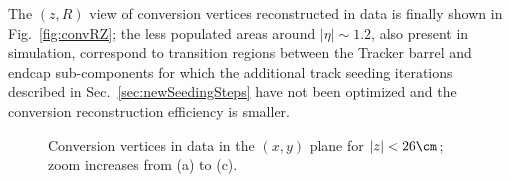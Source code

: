 The  $(z, R)$  view of conversion vertices reconstructed in data is finally shown in Fig.~\ref{fig:convRZ};  the less populated
areas  around $|\eta|\sim1.2$, also present in simulation, correspond to transition regions between the Tracker
barrel and endcap sub-components for which the additional track seeding
iterations described in Sec.~\ref{sec:newSeedingSteps} have not been optimized and the conversion reconstruction efficiency is smaller.

\begin{figure}[h!]
  \begin{center}
   \vspace{-0.6cm}
    \caption{Conversion vertices in data in the $(x,y)$ plane for $|z|<26\cm$; zoom increases from (a) to (c).}
    \label{fig:convXY}
  \end{center}
\end{figure}

